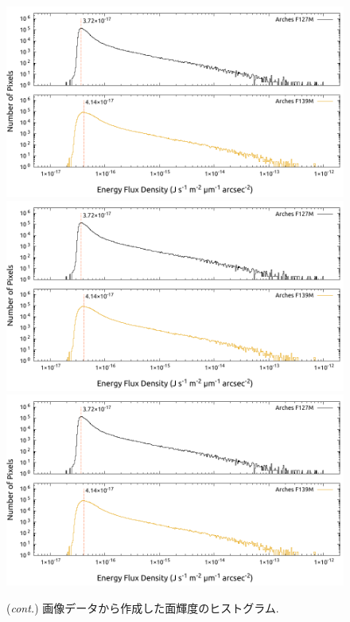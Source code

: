 \documentclass[10pt,a4paper,dvipdfmx,uplatex]{jsarticle}
\begin{document}
\addtocounter{figure}{-1}
\begin{figure}
  \centering
  \includegraphics[page=4,width=.9\linewidth]{img/histogram.pdf}
  \includegraphics[page=5,width=.9\linewidth]{img/histogram.pdf}
  \includegraphics[page=6,width=.9\linewidth]{img/histogram.pdf}
  \caption{(\textit{cont.}) 画像データから作成した面輝度のヒストグラム.}
  \label{fig:histogram:2}
\end{figure}
\end{document}
